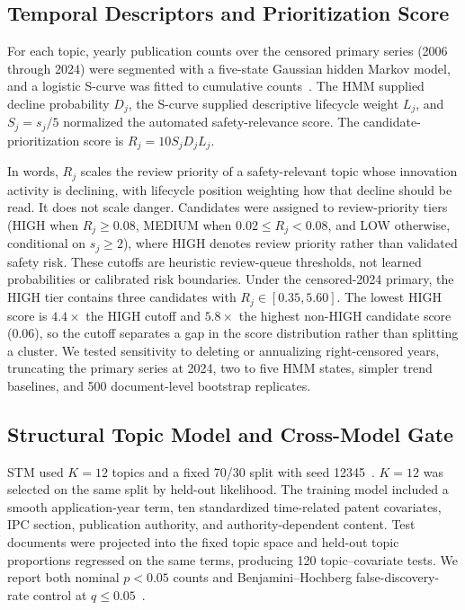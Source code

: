 \documentclass[letterpaper,9pt,conference]{ieeeconf}
\begin{document}
\subsection{Temporal Descriptors and Prioritization Score}

For each topic, yearly publication counts over the censored primary series (2006 through 2024) were segmented with a five-state Gaussian hidden Markov model, and a logistic S-curve was fitted to cumulative counts~\cite{rabiner1989}. The HMM supplied decline probability $D_{j}$, the S-curve supplied descriptive lifecycle weight $L_{j}$, and $S_{j} = s_{j}/5$ normalized the automated safety-relevance score. The candidate-prioritization score is $R_{j} = 10S_{j}D_{j}L_{j}$.

In words, $R_{j}$ scales the review priority of a safety-relevant topic whose innovation activity is declining, with lifecycle position weighting how that decline should be read. It does not scale danger. Candidates were assigned to review-priority tiers (HIGH when $R_{j} \geq 0.08$, MEDIUM when $0.02 \leq R_{j} < 0.08$, and LOW otherwise, conditional on $s_{j} \geq 2$), where HIGH denotes review priority rather than validated safety risk. These cutoffs are heuristic review-queue thresholds, not learned probabilities or calibrated risk boundaries. Under the censored-2024 primary, the HIGH tier contains three candidates with $R_{j} \in [0.35, 5.60]$. The lowest HIGH score is $4.4\times$ the HIGH cutoff and $5.8\times$ the highest non-HIGH candidate score (0.06), so the cutoff separates a gap in the score distribution rather than splitting a cluster. We tested sensitivity to deleting or annualizing right-censored years, truncating the primary series at 2024, two to five HMM states, simpler trend baselines, and 500 document-level bootstrap replicates.

\subsection{Structural Topic Model and Cross-Model Gate}

STM used $K = 12$ topics and a fixed 70/30 split with seed 12345~\cite{roberts2019,egami2022}. $K = 12$ was selected on the same split by held-out likelihood. The training model included a smooth application-year term, ten standardized time-related patent covariates, IPC section, publication authority, and authority-dependent content. Test documents were projected into the fixed topic space and held-out topic proportions regressed on the same terms, producing 120 topic--covariate tests. We report both nominal $p < 0.05$ counts and Benjamini--Hochberg false-discovery-rate control at $q \leq 0.05$~\cite{benjamini1995}.
\end{document}
